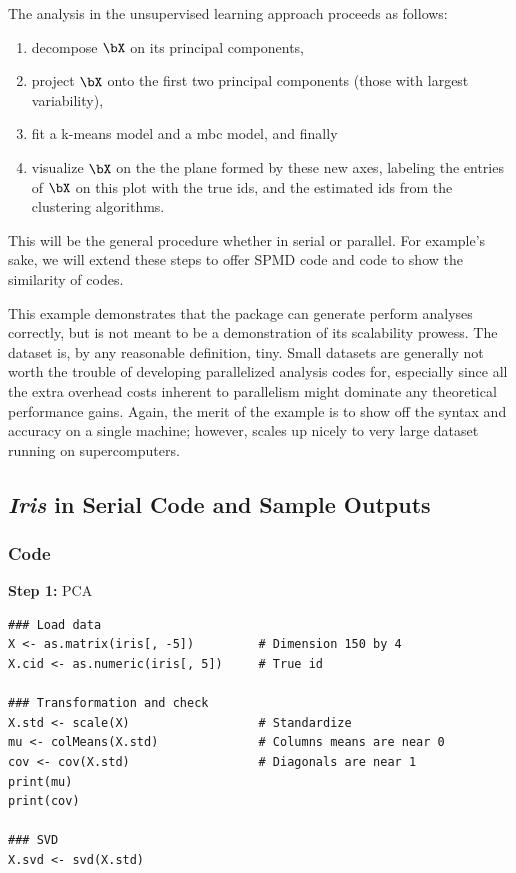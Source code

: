 The analysis in the unsupervised learning approach proceeds as follows:
\begin{enumerate}
\item decompose $\bX$ on its principal components,
\item project $\bX$ onto the first two principal components (those with largest variability),
\item fit a k-means model and a mbc model, and finally
\item visualize $\bX$ on the the plane formed by these new axes, labeling the entries of $\bX$ on this plot with the true ids, and the estimated ids from the clustering algorithms.
\end{enumerate}
This will be the general procedure whether in serial or parallel.  For example's sake, we will extend these steps 
to offer SPMD code and  code to show the similarity of codes.

This example demonstrates that the  package can generate perform analyses correctly, but is not
meant to be a demonstration of its scalability prowess.  The  dataset is, by any reasonable definition, tiny.  Small datasets are generally not worth the trouble of developing parallelized analysis codes for, especially since all the extra overhead costs inherent to parallelism might dominate any theoretical performance gains.  Again, the merit of the example is to show off the syntax and accuracy on a single machine; however,  scales up nicely to very large dataset running on supercomputers.



\subsection{{\it Iris} in Serial Code and Sample Outputs}

\subsubsection{Code}
\textbf{Step 1:}  PCA\vspace{-.6cm}
\begin{lstlisting}[language=rr]
### Load data
X <- as.matrix(iris[, -5])         # Dimension 150 by 4
X.cid <- as.numeric(iris[, 5])     # True id

### Transformation and check
X.std <- scale(X)                  # Standardize
mu <- colMeans(X.std)              # Columns means are near 0
cov <- cov(X.std)                  # Diagonals are near 1
print(mu)
print(cov)

### SVD
X.svd <- svd(X.std)
\end{lstlisting}

